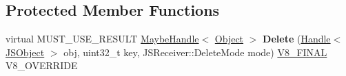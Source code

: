 \subsection*{Protected Member Functions}
\begin{DoxyCompactItemize}
\item 
\hypertarget{classv8_1_1internal_1_1_typed_elements_accessor_af2b3017131dcad0cd540bb7e5ab358af}{}virtual M\+U\+S\+T\+\_\+\+U\+S\+E\+\_\+\+R\+E\+S\+U\+L\+T \hyperlink{classv8_1_1internal_1_1_maybe_handle}{Maybe\+Handle}$<$ \hyperlink{classv8_1_1internal_1_1_object}{Object} $>$ {\bfseries Delete} (\hyperlink{classv8_1_1internal_1_1_handle}{Handle}$<$ \hyperlink{classv8_1_1internal_1_1_j_s_object}{J\+S\+Object} $>$ obj, uint32\+\_\+t key, J\+S\+Receiver\+::\+Delete\+Mode mode) \hyperlink{classv8_1_1internal_1_1_v8___f_i_n_a_l}{V8\+\_\+\+F\+I\+N\+A\+L} V8\+\_\+\+O\+V\+E\+R\+R\+I\+D\+E\label{classv8_1_1internal_1_1_typed_elements_accessor_af2b3017131dcad0cd540bb7e5ab358af}

\end{DoxyCompactItemize}
